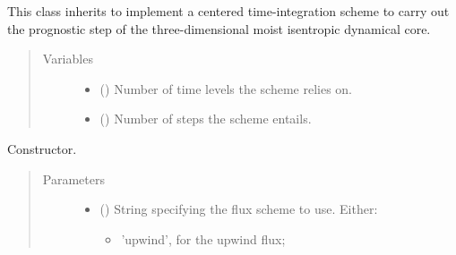 \documentclass[letterpaper,10pt,english]{sphinxmanual}
\begin{document}
\begin{fulllineitems}
\label{\detokenize{api:dycore.prognostic_isentropic_centered.PrognosticIsentropicCentered}}
This class inherits {\hyperref[\detokenize{api:dycore.prognostic_isentropic.PrognosticIsentropic}]{}} to implement
a centered time-integration scheme to carry out the prognostic step of the three-dimensional
moist isentropic dynamical core.
\begin{quote}\begin{description}
\item[{Variables}] \leavevmode\begin{itemize}
\item {} 
{\hyperref[\detokenize{api:dycore.dycore.DynamicalCore.time_levels}]{}} () \textendash{} Number of time levels the scheme relies on.

\item {} 
 () \textendash{} Number of steps the scheme entails.

\end{itemize}

\end{description}\end{quote}

\begin{fulllineitems}
\label{\detokenize{api:dycore.prognostic_isentropic_centered.PrognosticIsentropicCentered.__init__}}
Constructor.
\begin{quote}\begin{description}
\item[{Parameters}] \leavevmode\begin{itemize}
\item {} 
 () \textendash{} 
String specifying the flux scheme to use. Either:
\begin{itemize}
\item {} 
’upwind’, for the upwind flux;


\end{itemize}
\end{itemize}
\end{description}
\end{quote}
\end{fulllineitems}
\end{fulllineitems}
\end{document}
